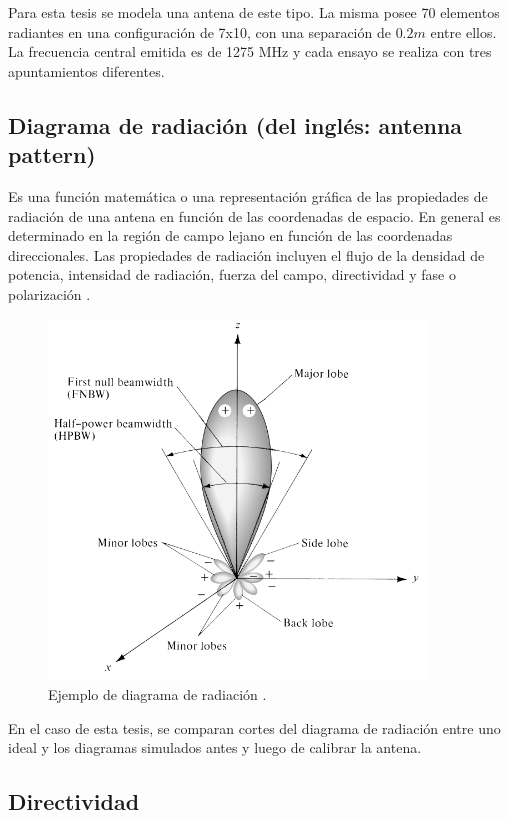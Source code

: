 Para esta tesis se modela una antena de este tipo. La misma posee 70 elementos radiantes en una configuración de 7x10, con una
separación de $0.2m$ entre ellos. La frecuencia central emitida es de 1275 MHz y cada ensayo se realiza con tres apuntamientos
diferentes. 


\subsection{Diagrama de radiación (del inglés: antenna pattern)}

Es una función matemática o una representación gráfica de las propiedades de radiación de una antena en función de las
coordenadas de espacio. En general es determinado en la región de campo lejano en función de las coordenadas direccionales.
Las propiedades de radiación incluyen el flujo de la densidad de potencia, intensidad de radiación, fuerza del campo,
directividad y fase o polarización \cite{Balanis2012}.

\begin{figure}[H]
 \centering
 \includegraphics[width=10cm]{gfx/arrayPattern.png}
 \caption{Ejemplo de diagrama de radiación \cite{Balanis2012}.}
\end{figure}

En el caso de esta tesis, se comparan cortes del diagrama de radiación entre uno ideal y los diagramas simulados antes y luego
de calibrar la antena.


\subsection{Directividad} 

